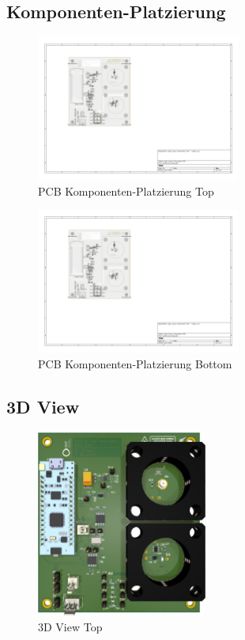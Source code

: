 \subsection{Komponenten-Platzierung}\label{sec:apdx_placement}

\begin{figure}[H]
    \centering
    \includegraphics[page=1, trim=120 220 450 80, clip, width=0.6\textwidth]{attachments/pcb_placement.pdf}
    \caption{PCB Komponenten-Platzierung Top}\label{fig:apdx_pcb_placement_1}
\end{figure}

\begin{figure}[H]
    \centering
    \includegraphics[page=2, trim=450 220 120 80, clip, width=0.6\textwidth]{attachments/pcb_placement.pdf}
    \caption{PCB Komponenten-Platzierung Bottom}\label{fig:apdx_pcb_placement_2}
\end{figure}
\pagebreak

\subsection{3D View}\label{sec:apdx_3D_view}

\begin{figure}[H]
    \centering
    \includegraphics[width=0.5\textwidth]{graphics/3d_top.png}
    \caption{3D View Top}\label{fig:apdx_3d_top}
\end{figure}

